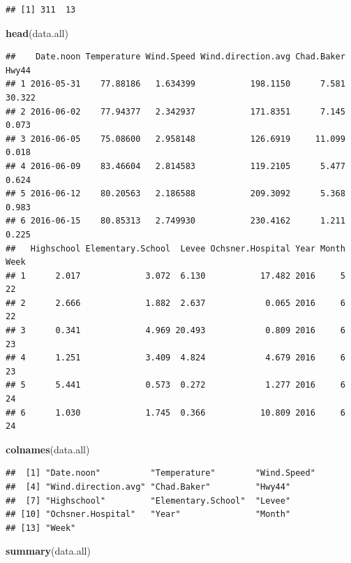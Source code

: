 \documentclass[12pt,]{article}
\newenvironment{Shaded}{\begin{snugshade}}{\end{snugshade}}
\newcommand{\KeywordTok}[1]{\textcolor[rgb]{0.13,0.29,0.53}{\textbf{#1}}}
\newcommand{\NormalTok}[1]{#1}
\begin{document}
\begin{verbatim}
## [1] 311  13
\end{verbatim}

\begin{Shaded}
\begin{Highlighting}[]
\KeywordTok{head}\NormalTok{(data.all)}
\end{Highlighting}
\end{Shaded}

\begin{verbatim}
##    Date.noon Temperature Wind.Speed Wind.direction.avg Chad.Baker  Hwy44
## 1 2016-05-31    77.88186   1.634399           198.1150      7.581 30.322
## 2 2016-06-02    77.94377   2.342937           171.8351      7.145  0.073
## 3 2016-06-05    75.08600   2.958148           126.6919     11.099  0.018
## 4 2016-06-09    83.46604   2.814583           119.2105      5.477  0.624
## 5 2016-06-12    80.20563   2.186588           209.3092      5.368  0.983
## 6 2016-06-15    80.85313   2.749930           230.4162      1.211  0.225
##   Highschool Elementary.School  Levee Ochsner.Hospital Year Month Week
## 1      2.017             3.072  6.130           17.482 2016     5   22
## 2      2.666             1.882  2.637            0.065 2016     6   22
## 3      0.341             4.969 20.493            0.809 2016     6   23
## 4      1.251             3.409  4.824            4.679 2016     6   23
## 5      5.441             0.573  0.272            1.277 2016     6   24
## 6      1.030             1.745  0.366           10.809 2016     6   24
\end{verbatim}

\begin{Shaded}
\begin{Highlighting}[]
\KeywordTok{colnames}\NormalTok{(data.all)}
\end{Highlighting}
\end{Shaded}

\begin{verbatim}
##  [1] "Date.noon"          "Temperature"        "Wind.Speed"        
##  [4] "Wind.direction.avg" "Chad.Baker"         "Hwy44"             
##  [7] "Highschool"         "Elementary.School"  "Levee"             
## [10] "Ochsner.Hospital"   "Year"               "Month"             
## [13] "Week"
\end{verbatim}

\begin{Shaded}
\begin{Highlighting}[]
\KeywordTok{summary}\NormalTok{(data.all)}
\end{Highlighting}
\end{Shaded}
\end{document}
